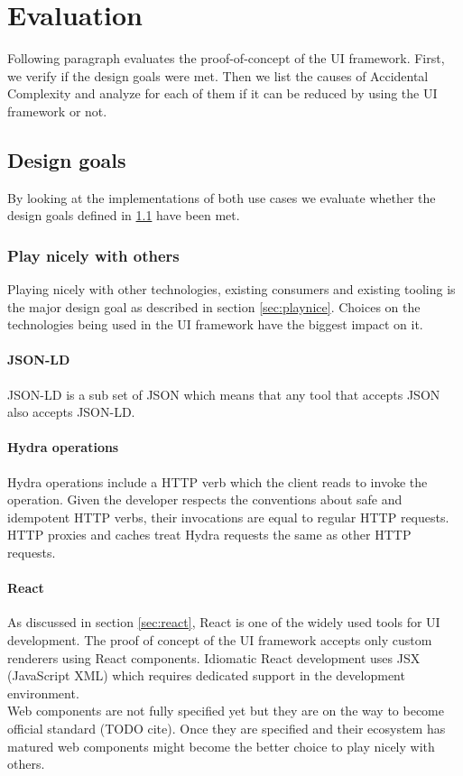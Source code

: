 \section{Evaluation}
Following paragraph evaluates the proof-of-concept of the UI framework. First, we verify if the design goals were met. Then we list the causes of Accidental Complexity and analyze for each of them if it can be reduced by using the UI framework or not.

\subsection{Design goals}\label{sec:designgoals}
By looking at the implementations of both use cases we evaluate whether the design goals defined in \ref{sec:designgoals} have been met.

\subsubsection{Play nicely with others}
Playing nicely with other technologies, existing consumers and existing tooling is the major design goal as described in section \ref{sec:playnice}. Choices on the technologies being used in the UI framework have the biggest impact on it.

\paragraph{JSON-LD}
JSON-LD is a sub set of JSON which means that any tool that accepts JSON also accepts JSON-LD.

\paragraph{Hydra operations}
Hydra operations include a HTTP verb which the client reads to invoke the operation. Given the developer respects the conventions about safe and idempotent HTTP verbs, their invocations are equal to regular HTTP requests. HTTP proxies and caches treat Hydra requests the same as other HTTP requests.

\paragraph{React}
As discussed in section \ref{sec:react}, React is one of the widely used tools for UI development. The proof of concept of the UI framework accepts only custom renderers using React components. Idiomatic React development uses JSX (JavaScript XML) which requires dedicated support in the development environment. \\
Web components are not fully specified yet but they are on the way to become official standard (TODO cite). Once they are specified and their ecosystem has matured web components might become the better choice to play nicely with others.

